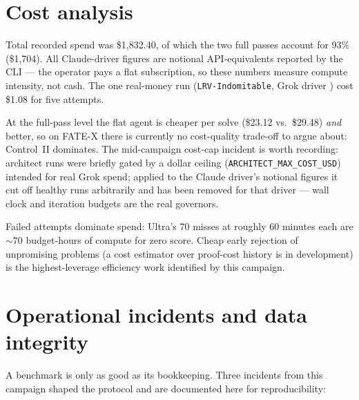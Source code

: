 \documentclass[12pt, a4paper]{article}
\newcommand{\run}[1]{\texttt{#1}}
\begin{document}
\section{Cost analysis}
\label{sec:cost}

Total recorded spend was \$1{,}832.40, of which the two full passes account
for 93\% (\$1{,}704). All Claude-driver figures are notional API-equivalents
reported by the CLI --- the operator pays a flat subscription, so these
numbers measure compute intensity, not cash. The one real-money run
(\run{LRV-Indomitable}, Grok driver \cite{xai2025grok41}) cost \$1.08 for
five attempts.

At the full-pass level the flat agent is cheaper per solve (\$23.12 vs.\
\$29.48) \emph{and} better, so on FATE-X there is currently no
cost-quality trade-off to argue about: Control~II dominates. The
mid-campaign cost-cap incident is worth recording: architect runs were
briefly gated by a dollar ceiling (\run{ARCHITECT\_MAX\_COST\_USD})
intended for real Grok spend; applied to the Claude driver's notional
figures it cut off healthy runs arbitrarily and has been removed for that
driver --- wall clock and iteration budgets are the real governors.

Failed attempts dominate spend: Ultra's 70 misses at roughly 60 minutes each
are ${\sim}70$ budget-hours of compute for zero score. Cheap early rejection
of unpromising problems (a cost estimator over proof-cost history is in
development) is the highest-leverage efficiency work identified by this
campaign.

\section{Operational incidents and data integrity}
\label{sec:incidents}

A benchmark is only as good as its bookkeeping. Three incidents from this
campaign shaped the protocol and are documented here for reproducibility:
\end{document}
